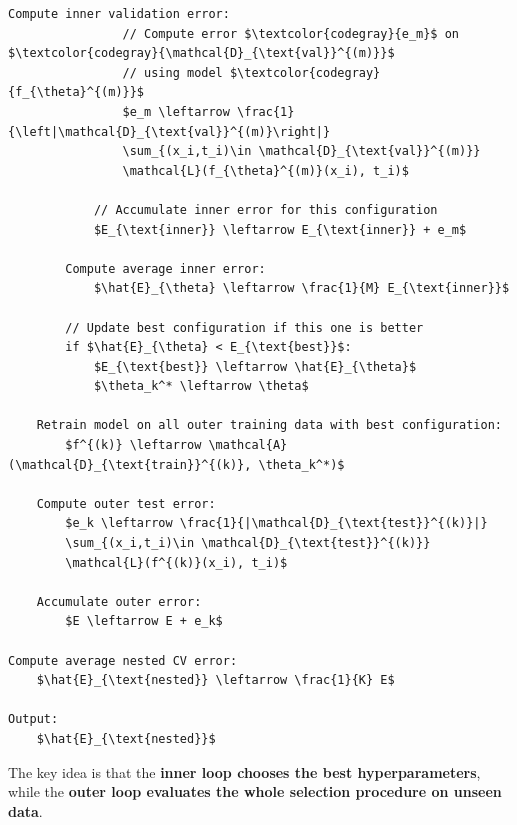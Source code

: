 \begin{lstlisting}[language=pseudo-code,mathescape=true,style={pseudocode-style},caption={Nested Cross-Validation Algorithm}]
            Compute inner validation error:
                // Compute error $\textcolor{codegray}{e_m}$ on $\textcolor{codegray}{\mathcal{D}_{\text{val}}^{(m)}}$
                // using model $\textcolor{codegray}{f_{\theta}^{(m)}}$
                $e_m \leftarrow \frac{1}{\left|\mathcal{D}_{\text{val}}^{(m)}\right|}
                \sum_{(x_i,t_i)\in \mathcal{D}_{\text{val}}^{(m)}}
                \mathcal{L}(f_{\theta}^{(m)}(x_i), t_i)$

            // Accumulate inner error for this configuration
            $E_{\text{inner}} \leftarrow E_{\text{inner}} + e_m$

        Compute average inner error:
            $\hat{E}_{\theta} \leftarrow \frac{1}{M} E_{\text{inner}}$

        // Update best configuration if this one is better
        if $\hat{E}_{\theta} < E_{\text{best}}$:
            $E_{\text{best}} \leftarrow \hat{E}_{\theta}$
            $\theta_k^* \leftarrow \theta$

    Retrain model on all outer training data with best configuration:
        $f^{(k)} \leftarrow \mathcal{A}(\mathcal{D}_{\text{train}}^{(k)}, \theta_k^*)$

    Compute outer test error:
        $e_k \leftarrow \frac{1}{|\mathcal{D}_{\text{test}}^{(k)}|}
        \sum_{(x_i,t_i)\in \mathcal{D}_{\text{test}}^{(k)}}
        \mathcal{L}(f^{(k)}(x_i), t_i)$

    Accumulate outer error:
        $E \leftarrow E + e_k$

Compute average nested CV error:
    $\hat{E}_{\text{nested}} \leftarrow \frac{1}{K} E$

Output:
    $\hat{E}_{\text{nested}}$
\end{lstlisting}
The key idea is that the \textbf{inner loop chooses the best hyperparameters}, while the \textbf{outer loop evaluates the whole selection procedure on unseen data}.

\newpage

